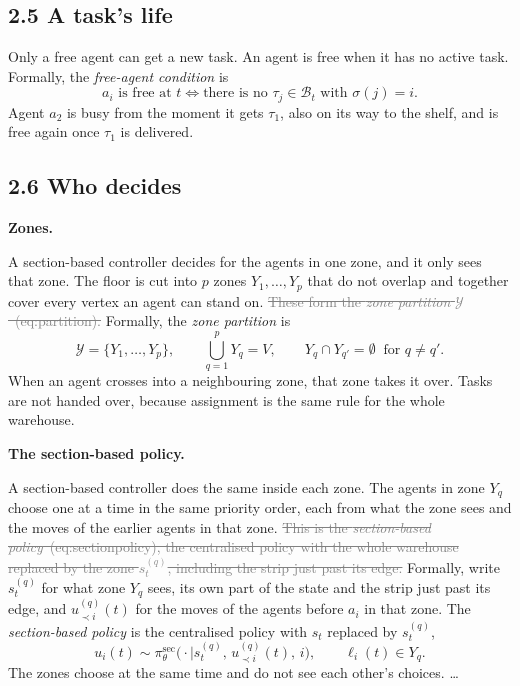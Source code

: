 \documentclass[11pt,a4paper]{article}
\newcommand{\new}[1]{\textcolor{newc}{#1}}
\newcommand{\old}[1]{\textcolor{gray}{\sout{#1}}}
\newenvironment{greenblock}{\color{newc}}{}
\begin{document}
\subsection*{2.5 A task's life}

Only a free agent can get a new task. An agent is free when it has no active
task. \new{Formally, the \emph{free-agent condition} is}
\begin{greenblock}
\[
  a_i \text{ is free at } t
  \iff
  \text{there is no } \tau_j \in \mathcal{B}_t \text{ with } \sigma(j)=i .
  \tag{free agent}
\]
\end{greenblock}
Agent $a_2$ is busy from the moment it gets $\tau_1$, also on its way to the
shelf, and is free again once $\tau_1$ is delivered.

\subsection*{2.6 Who decides}

\textbf{Zones.}

A section-based controller decides for the agents in one zone, and it only
sees that zone. The floor is cut into $p$ zones $Y_1,\dots,Y_p$ that do not
overlap and together cover every vertex an agent can stand on. \old{These form
the \emph{zone partition} $\mathcal{Y}$~(eq:partition).} \new{Formally, the
\emph{zone partition} is}
\begin{greenblock}
\[
  \mathcal{Y} = \{Y_1,\dots,Y_p\}, \qquad
  \bigcup_{q=1}^{p} Y_q = V, \qquad
  Y_q \cap Y_{q'} = \emptyset \ \text{ for } q \neq q' .
  \tag{zone partition}
\]
\end{greenblock}
When an agent crosses into a neighbouring zone, that zone takes it over.
Tasks are not handed over, because assignment is the same rule for the whole
warehouse.

\textbf{The section-based policy.}

A section-based controller does the same inside each zone. The agents in
zone $Y_q$ choose one at a time in the same priority order, each from what
the zone sees and the moves of the earlier agents in that zone. \old{This is
the \emph{section-based policy}~(eq:sectionpolicy), the centralised policy
with the whole warehouse replaced by the zone $s^{(q)}_t$, including the
strip just past its edge.} \new{Formally, write $s^{(q)}_t$ for what zone
$Y_q$ sees, its own part of the state and the strip just past its edge, and
$u^{(q)}_{\prec i}(t)$ for the moves of the agents before $a_i$ in that zone.
The \emph{section-based policy} is the centralised policy with $s_t$
replaced by $s^{(q)}_t$,}
\begin{greenblock}
\[
  u_i(t) \sim \pi^{\mathrm{sec}}_\theta\bigl(\cdot \mid s^{(q)}_t,\, u^{(q)}_{\prec i}(t),\, i\bigr),
  \qquad \ell_i(t) \in Y_q .
  \tag{section-based policy}
\]
\end{greenblock}
The zones choose at the same time and do not see each other's choices. \dots
\end{document}
